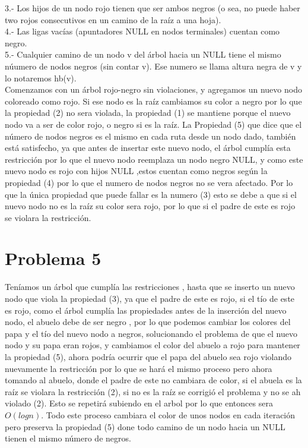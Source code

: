 \documentclass[12pt,letterpaper]{article}
\begin{document}
    3.- Los hijos de un nodo rojo tienen que ser ambos negros (o sea, no puede haber two rojos consecutivos en un camino de la raíz a una hoja).\\
    
    4.- Las ligas vacías (apuntadores NULL en nodos terminales) cuentan como negro.\\
    
    5.- Cualquier camino de un nodo v del árbol hacia un NULL tiene el mismo núumero de nodos negros (sin contar v). Ese numero se llama altura negra de v y lo notaremos hb(v).\\

    
    Comenzamos con un árbol rojo-negro sin violaciones, y agregamos un nuevo nodo coloreado como rojo. Si ese nodo es la raíz cambiamos su color a negro por lo que la propiedad (2) no sera violada, la propiedad (1) se mantiene porque el nuevo nodo va a ser de color rojo, o negro si es la raíz. La Propiedad (5) que dice que el número de nodos negros es el mismo en cada ruta  desde un nodo dado, también está satisfecho, ya que antes de insertar este nuevo nodo, el árbol cumplía esta restricción por lo que el nuevo nodo  reemplaza un nodo negro NULL, y como este nuevo nodo  es rojo con hijos NULL ,estos cuentan como negros según la propiedad (4) por lo que el numero de nodos negros no se vera afectado. Por lo que la única propiedad que puede fallar es la numero (3) esto se debe a que si el nuevo nodo no es la raíz su color sera rojo, por lo que si el padre de este es rojo se violara la restricción.
    
\section{Problema 5}
    Teníamos un árbol que cumplía las restricciones , hasta que se inserto un nuevo nodo que viola la propiedad (3), ya que el padre de este es rojo, si el tío de este es rojo, como el árbol cumplía las propiedades antes de la inserción del nuevo nodo, el abuelo debe de ser negro , por lo que podemos cambiar los colores del papa y el tío del nuevo nodo a negros, solucionando el problema de que el nuevo nodo y su papa eran rojos, y cambiamos el color del abuelo a rojo para mantener la propiedad (5), ahora podría ocurrir que el papa del abuelo sea rojo violando nuevamente la restricción por lo que se hará el mismo proceso pero ahora tomando al abuelo, donde el padre de este no cambiara de color, si el abuela es la raíz se violara la restricción (2), si no es la raíz se corrigió el problema y no se ah violado (2). Esto se repetirá subiendo en el arbol por lo que entonces sera $O(log n)$. Todo este proceso cambiara el color de unos nodos en cada iteración pero preserva la propiedad (5) done todo camino de un nodo hacia un NULL  tienen el mismo número de negros.
\end{document}
